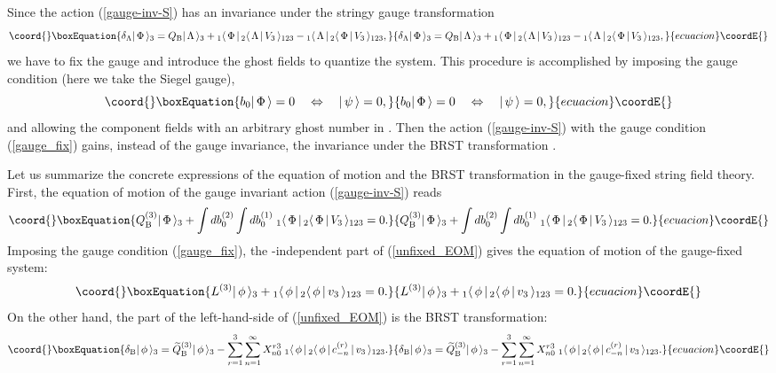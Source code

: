 \documentclass[a4paper,12pt]{article}
\begin{document}
Since the action (\ref{gauge-inv-S}) has an invariance under the
stringy gauge transformation
\begin{equation}\coord{}\boxEquation{
  \label{gauge_trf}
  \delta_{\Lambda} \sket{\Phi}=
    \QB \sket{\Lambda} + \bbk{\Phi}{\Lambda}{V_3}
   -\bbk{\Lambda}{\Phi}{V_3},
}{
  \delta_{\Lambda} \sket{\Phi}=
    \QB \sket{\Lambda} + \bbk{\Phi}{\Lambda}{V_3}
   -\bbk{\Lambda}{\Phi}{V_3},
}{ecuacion}\coordE{}\end{equation}
we have to fix the gauge and introduce the ghost fields to quantize
the system. This procedure is accomplished by imposing the gauge
condition (here we take the Siegel gauge),
\begin{equation}\coord{}\boxEquation{
  \label{gauge_fix}
  b_0 \ket{\Phi} = 0\quad
\Leftrightarrow\quad \ket{\psi}=0,
}{
  b_0 \ket{\Phi} = 0\quad
\Leftrightarrow\quad \ket{\psi}=0,
}{ecuacion}\coordE{}\end{equation}
and allowing the component fields with an arbitrary ghost number in
\myHighlight{$\ket{\phi}$}\coordHE{}. Then the action (\ref{gauge-inv-S}) with the gauge
condition (\ref{gauge_fix}) gains, instead of the gauge invariance,
the invariance under the BRST transformation
\coordHE{}.

Let us summarize the concrete expressions of the equation of motion
and the BRST transformation in the gauge-fixed string field theory.
First, the equation of motion of the gauge invariant action
(\ref{gauge-inv-S}) reads
\begin{equation}\coord{}\boxEquation{
  \label{unfixed_EOM}
  \QB^{(3)} \sket{\Phi} + \int db_0^{(2)} \int db_0^{(1)}\;
       \bbk{\Phi}{\Phi}{V_3} =0.
}{
  \QB^{(3)} \sket{\Phi} + \int db_0^{(2)} \int db_0^{(1)}\;
       \bbk{\Phi}{\Phi}{V_3} =0.
}{ecuacion}\coordE{}\end{equation}
Imposing the gauge condition (\ref{gauge_fix}), the
\coordHE{}-independent part of (\ref{unfixed_EOM}) gives the equation
of motion of the gauge-fixed system:
\begin{equation}\coord{}\boxEquation{
  \label{fixed_EOM}
  L^{(3)}\sket{\phi} + \bbk{\phi}{\phi}{v_3} = 0 .
}{
  L^{(3)}\sket{\phi} + \bbk{\phi}{\phi}{v_3} = 0 .
}{ecuacion}\coordE{}\end{equation}
On the other hand, the \coordHE{} part of the left-hand-side of
(\ref{unfixed_EOM}) is the BRST transformation:
\begin{equation}\coord{}\boxEquation{
  \delB \sket{\phi} = \tilQ^{(3)} \sket{\phi} -
       \sum_{r=1}^{3}\sum_{n=1}^{\infty}
         \X{r3}{n0} \; \bbok{\phi}{\phi}{c_{-n}^{(r)}}{v_3}.
       \label{BRST_trf}
}{
  \delB \sket{\phi} = \tilQ^{(3)} \sket{\phi} -
       \sum_{r=1}^{3}\sum_{n=1}^{\infty}
         \X{r3}{n0} \; \bbok{\phi}{\phi}{c_{-n}^{(r)}}{v_3}.
       }{ecuacion}\coordE{}\end{equation}
\end{document}
